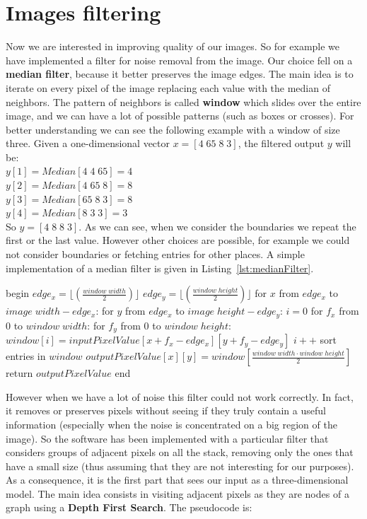 \section{Images filtering}\label{sec32:ImagesFiltering}
Now we are interested in improving quality of our images. So for example we have implemented a filter for noise removal from the image. Our choice fell on a \textbf{median filter}, because it better preserves the image edges. The main idea is to iterate on every pixel of the image replacing each value with the median of neighbors. The pattern of neighbors is called \textbf{window} which slides over the entire image, and we can have a lot of possible patterns (such as boxes or crosses). For better understanding we can see the following example with a window of size three. Given a one-dimensional vector $x = [4\; 65\; 8\; 3]$, the filtered output $y$ will be:\\
$y[1] = Median[4\; 4\; 65] = 4$\\
$y[2] = Median[4\; 65\; 8] = 8$\\
$y[3] = Median[65\; 8\; 3] = 8$\\
$y[4] = Median[8\; 3\; 3] = 3$\\
So $y = [4\; 8\; 8\; 3]$. As we can see, when we consider the boundaries  we repeat the first or the last value. However other choices are possible, for example we could not consider boundaries or fetching entries for other places. A simple implementation of a median filter is given in Listing~\ref{lst:medianFilter}.\newpage

\begin{pseudo}[caption={Median filter}, label={lst:medianFilter}]
begin
  $edge_x = \displaystyle\lfloor(\frac{window\; width}{2})\rfloor$
  $edge_y = \displaystyle\lfloor(\frac{window\; height}{2})\rfloor$
  for $x$ from $edge_x$ to $image\; width - edge_x$:
    for $y$ from $edge_x$ to $image\; height - edge_y$:
      $i = 0$
      for $f_x$ from $0$ to $window\; width$:
        for $f_y$ from $0$ to $window\; height$:
          $window[i] = inputPixelValue[x + f_x - edge_x][y + f_y - edge_y]$
          $i++$
      sort entries in $window$
      $outputPixelValue[x][y] = window[\displaystyle\frac{window\; width \cdot window\; height}{2}]$
  return $outputPixelValue$
end       
\end{pseudo}

However when we have a lot of noise this filter could not work correctly. In fact, it removes or preserves pixels without seeing if they truly contain a useful information (especially when the noise is concentrated on a big region of the image). So the software has been implemented with a particular filter that considers groups of adjacent pixels on all the stack, removing only the ones that have a small size (thus assuming that they are not interesting for our purposes). As a consequence, it is the first part that sees our input as a three-dimensional model. The main idea consists in visiting adjacent pixels as they are nodes of a graph using a \textbf{Depth First Search}. The pseudocode is:

